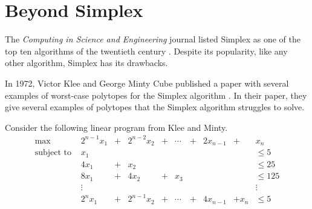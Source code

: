\section*{Beyond Simplex}
The \emph{Computing in Science and Engineering} journal listed Simplex as one of the top ten algorithms of the twentieth century \cite{Nash2000}.
Despite its popularity, like any other algorithm, Simplex has its drawbacks.

In 1972, Victor Klee and George Minty Cube published a paper with several examples of worst-case polytopes for the Simplex algorithm \cite{Klee1972}.
In their paper, they give several examples of polytopes that the Simplex algorithm struggles to solve.

Consider the following linear program from Klee and Minty.
\begin{align*}
\text{max } & 2^{n-1}x_1 & + & 2^{n-2}x_2  & + & \cdots & + & 2x_{n-1} & + & x_n\\
\text{subject to } & x_1 &  &  &  &  &  &  &  &\leq 5\\
& 4x_1 & + & x_2 &  &  &  &  &  &\leq 25\\
& 8x_1 & + & 4x_2 & + & x_3 &  &  &  &\leq 125\\
& \vdots & &      &   &     &  &  &  &\vdots\\
& 2^n x_1 & + & 2^{n-1} x_2 & + & \cdots & + & 4x_{n-1} & + x_n &\leq 5\\
\end{align*}

